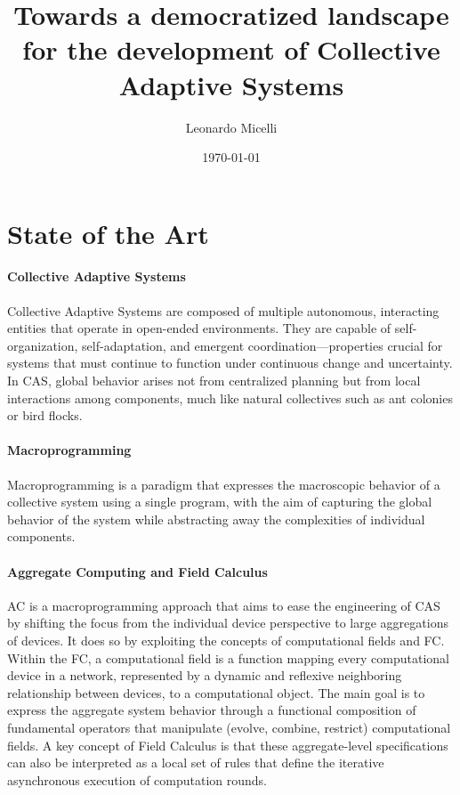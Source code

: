 \documentclass[12pt]{article}
\begin{document}
\title{Towards a democratized landscape for the development of Collective Adaptive Systems}
\author{Leonardo Micelli}
\date{\today}
\maketitle

\noindent


\newpage
\setcounter{tocdepth}{2}

\setlength{\parindent}{0em}
\setlength{\parskip}{1em}

\section{State of the Art}
\paragraph{\textbf{Collective Adaptive Systems}} Collective Adaptive Systems are composed of multiple autonomous, interacting entities that operate in open-ended environments. 
They are capable of self-organization, self-adaptation, and emergent coordination—properties crucial for systems that must continue to function under continuous change and uncertainty.
In CAS, global behavior arises not from centralized planning but from local interactions among components, much like natural collectives such as ant colonies or bird flocks.

\paragraph{\textbf{Macroprogramming}} Macroprogramming\cite{10.1145/3579353} is a paradigm that expresses the macroscopic behavior of a collective system using a single program, with the aim of
capturing the global behavior of the system while abstracting away the complexities of individual components.

\paragraph{\textbf{Aggregate Computing and Field Calculus}} AC\cite{beal2016aggregate} is a macroprogramming approach that aims to ease the engineering of CAS by shifting the
focus from the individual device perspective to large aggregations of devices. It does so by exploiting the concepts of computational fields and FC.
Within the FC, a computational field is a function mapping every computational device in a network, represented by a dynamic and reflexive neighboring
relationship between devices, to a computational object. The main goal is to express the aggregate system behavior
through a functional composition of fundamental operators that manipulate (evolve, combine, restrict)
computational fields. A key concept of Field Calculus is that these aggregate-level specifications can
also be interpreted as a local set of rules that define the iterative asynchronous execution of computation rounds.
\end{document}
